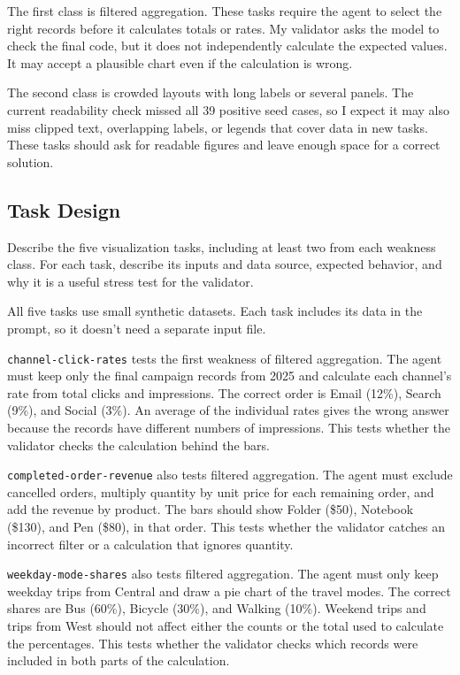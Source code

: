 \documentclass[11pt]{article}
\begin{document}
\medskip
The first class is filtered aggregation. These tasks require the agent to select
the right records before it calculates totals or rates. My validator asks the
model to check the final code, but it does not independently calculate the
expected values. It may accept a plausible chart even if the calculation is wrong.

The second class is crowded layouts with long labels or several panels. The
current readability check missed all 39 positive seed cases, so I expect it may
also miss clipped text, overlapping labels, or legends that cover data in new
tasks. These tasks should ask for readable figures and leave enough space for
a correct solution.

\subsection{Task Design}
Describe the five visualization tasks, including at least two from each
weakness class. For each task, describe its inputs and data source, expected
behavior, and why it is a useful stress test for the validator.

\medskip
All five tasks use small synthetic datasets. Each task includes its data in
the prompt, so it doesn't need a separate input file.

\texttt{channel-click-rates} tests the first weakness of filtered aggregation.
The agent must keep only the final campaign records from 2025 and calculate each
channel's rate from total clicks and impressions. The correct order is Email
(12\%), Search (9\%), and Social (3\%). An average of the individual rates gives
the wrong answer because the records have different numbers of impressions.
This tests whether the validator checks the calculation behind the bars.

\texttt{completed-order-revenue} also tests filtered aggregation. The agent
must exclude cancelled orders, multiply quantity by unit price for each remaining
order, and add the revenue by product. The bars should show Folder (\$50),
Notebook (\$130), and Pen (\$80), in that order. This tests whether the validator
catches an incorrect filter or a calculation that ignores quantity.

\texttt{weekday-mode-shares} also tests filtered aggregation. The agent
must only keep weekday trips from Central and draw a pie chart of the travel
modes. The correct shares are Bus (60\%), Bicycle (30\%), and Walking (10\%).
Weekend trips and trips from West should not affect either the counts or the
total used to calculate the percentages. This tests whether the validator checks
which records were included in both parts of the calculation.
\end{document}
